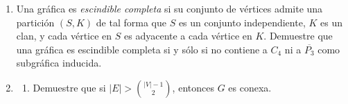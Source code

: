 \documentclass{article}
\begin{document}
\begin{enumerate}
\begin{proof}
\begin{itemize}
      pues de la dicotomia se cumple con $<$. Además sabemos que el número de
      componentes conexas aumenta exactamente en $1$ (porque estamos trabjando
      con gráficas simples) en $G -e$, de lo anterior se sigue que
      \begin{eqnarray}
        c(G -e) = c(G) +1\\
        \Rightarrow c(G -e) \leq c(G) +1
      \end{eqnarray}
      de $7$ y $9$ se sigue
      \[
      c(G) \le c(G-e) \le c(G) + 1
      \]
    \end{itemize}
    De lo anterior concluimos que $c(G) \le c(G-e) \le c(G) + 1$.
  \end{proof}
\item Una gr\'afica es \textit{escindible completa} si su conjunto de
  v\'ertices admite una partici\'on $(S,K)$ de tal forma que $S$ es un
  conjunto independiente, $K$ es un clan, y cada v\'ertice en $S$ es adyacente
  a cada v\'ertice en $K$.   Demuestre que una gr\'afica es escindible
  completa si y s\'olo si no contiene a $C_4$ ni a $\overline{P_3}$ como
  subgr\'afica inducida.
\item \begin{enumerate}
\item Demuestre que si $|E| > {|V|-1 \choose 2}$, entonces $G$ es conexa.
  

\end{enumerate}
\end{enumerate}
\end{document}
